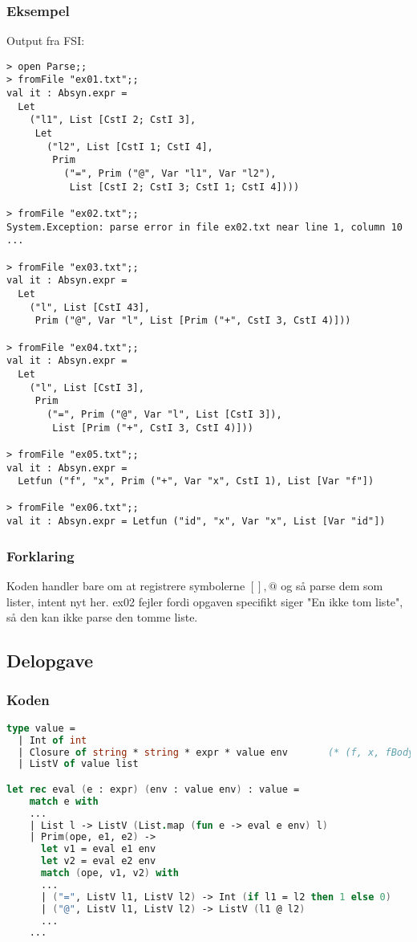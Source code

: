 \subsubsection{Eksempel}
Output fra FSI:
\begin{lstlisting}
> open Parse;;
> fromFile "ex01.txt";;
val it : Absyn.expr =
  Let
    ("l1", List [CstI 2; CstI 3],
     Let
       ("l2", List [CstI 1; CstI 4],
        Prim
          ("=", Prim ("@", Var "l1", Var "l2"),
           List [CstI 2; CstI 3; CstI 1; CstI 4])))

> fromFile "ex02.txt";;
System.Exception: parse error in file ex02.txt near line 1, column 10
...

> fromFile "ex03.txt";;
val it : Absyn.expr =
  Let
    ("l", List [CstI 43],
     Prim ("@", Var "l", List [Prim ("+", CstI 3, CstI 4)]))

> fromFile "ex04.txt";;
val it : Absyn.expr =
  Let
    ("l", List [CstI 3],
     Prim
       ("=", Prim ("@", Var "l", List [CstI 3]),
        List [Prim ("+", CstI 3, CstI 4)]))

> fromFile "ex05.txt";;
val it : Absyn.expr =
  Letfun ("f", "x", Prim ("+", Var "x", CstI 1), List [Var "f"])

> fromFile "ex06.txt";;
val it : Absyn.expr = Letfun ("id", "x", Var "x", List [Var "id"])
\end{lstlisting}

\subsubsection{Forklaring}
Koden handler bare om at registrere symbolerne $[],@$ og så parse dem som lister, intent nyt her. ex02 fejler fordi opgaven specifikt siger "En ikke tom liste", så den kan ikke parse den tomme liste.

\subsection{Delopgave }\label{ass:4-2}
\subsubsection{Koden}
\begin{lstlisting}[language=fsharp]
type value = 
  | Int of int
  | Closure of string * string * expr * value env       (* (f, x, fBody, fDeclEnv) *)
  | ListV of value list

let rec eval (e : expr) (env : value env) : value =
    match e with
    ...
    | List l -> ListV (List.map (fun e -> eval e env) l) 
    | Prim(ope, e1, e2) -> 
      let v1 = eval e1 env
      let v2 = eval e2 env
      match (ope, v1, v2) with
      ...
      | ("=", ListV l1, ListV l2) -> Int (if l1 = l2 then 1 else 0)
      | ("@", ListV l1, ListV l2) -> ListV (l1 @ l2)
      ...
    ...
\end{lstlisting}

